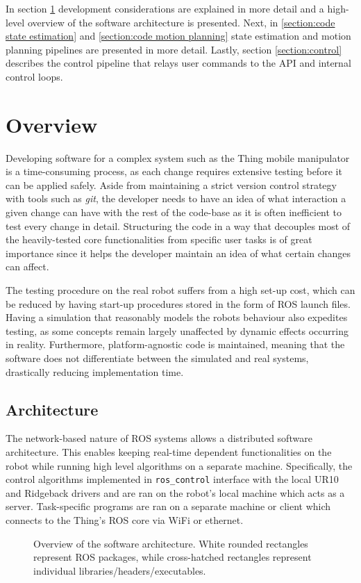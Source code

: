 \documentclass[times, utf8, diplomski, english]{fer}
\begin{document}
In section \ref{section:overview} development considerations are explained in more detail and a high-level overview of the software architecture is presented.
Next, in \ref{section:code state estimation} and \ref{section:code motion planning} state estimation and motion planning pipelines are presented in more detail.%
Lastly, section \ref{section:control} describes the control pipeline that relays user commands to the API and internal control loops. %

\section{Overview}\label{section:overview}
Developing software for a complex system such as the Thing mobile manipulator is a time-consuming process, as each change requires extensive testing before it can be applied safely.
Aside from maintaining a strict version control strategy with tools such as \textit{git}, the developer needs to have an idea of what interaction a given change can have with the rest of the code-base as it is often inefficient to test every change in detail.
Structuring the code in a way that decouples most of the heavily-tested core functionalities from specific user tasks is of great importance since it helps the developer maintain an idea of what certain changes can affect.

The testing procedure on the real robot suffers from a high set-up cost, which can be reduced by having start-up procedures stored in the form of ROS launch files.
Having a simulation that reasonably models the robots behaviour also expedites testing, as some concepts remain largely unaffected by dynamic effects occurring in reality.
Furthermore, platform-agnostic code is maintained, meaning that the software does not differentiate between the simulated and real systems, drastically reducing implementation time.
\subsection{Architecture}
The network-based nature of ROS systems allows a distributed software architecture.
This enables keeping real-time dependent functionalities on the robot while running high level algorithms on a separate machine.
Specifically, the control algorithms implemented in \verb|ros_control| interface with the local UR10 and Ridgeback drivers and are ran on the robot's local machine which acts as a server.
Task-specific programs are ran on a separate machine or client which connects to the Thing's ROS core via WiFi or ethernet.
\begin{figure}\label{fig:overview}

\caption{Overview of the software architecture. White rounded rectangles represent ROS packages, while cross-hatched rectangles represent individual libraries/headers/executables.}
\end{figure} 
\end{document}

